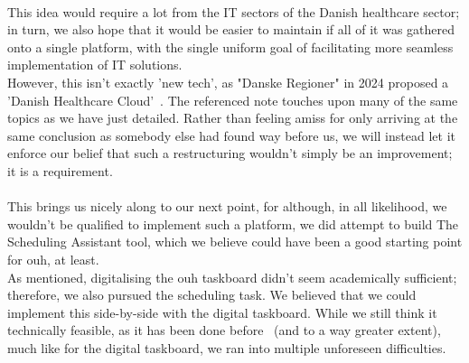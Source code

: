 \\
This idea would require a lot from the IT sectors of the Danish healthcare sector; in turn, we also hope that it would be easier to maintain if all of it was gathered onto a single platform, with the single uniform goal of facilitating more seamless implementation of IT solutions.
\\
However, this isn't exactly 'new tech', as "Danske Regioner" in 2024 proposed a 'Danish Healthcare Cloud'~\cite{Den-Reg-digitalisation}. The referenced note touches upon many of the same topics as we have just detailed. Rather than feeling amiss for only arriving at the same conclusion as somebody else had found way before us, we will instead let it enforce our belief that such a restructuring wouldn't simply be an improvement; it is a requirement.
\\
\\
This brings us nicely along to our next point, for although, in all likelihood, we wouldn't be qualified to implement such a platform, we did attempt to build The Scheduling Assistant tool, which we believe could have been a good starting point for \acrshort{ouh}, at least.
\\
As mentioned, digitalising the \acrshort{ouh} taskboard didn't seem academically sufficient; therefore, we also pursued the scheduling task. We believed that we could implement this side-by-side with the digital taskboard. While we still think it technically feasible, as it has been done before~\cite{you-but-better} (and to a way greater extent), much like for the digital taskboard, we ran into multiple unforeseen difficulties.

